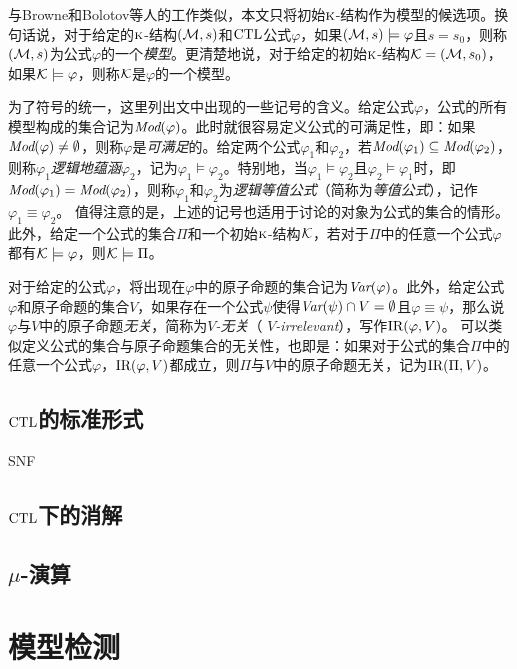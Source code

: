 与Browne和Bolotov等人的工作类似，本文只将初始$\textsc{k}$-结构作为模型的候选项\cite{browne1988characterizing,Bolotov:1999:JETAI}。换句话说，对于给定的$\textsc{k}$-结构$({\cal M},s)$和$\textrm{CTL}$公式$\varphi$，如果$({\cal M},s)\models \varphi$且$s = s_0$，则称$({\cal M},s)$为公式$\varphi$的一个\emph{模型}。更清楚地说，对于给定的初始$\textsc{k}$-结构${\cal K}=({\cal M},s_0)$，如果${\cal K} \models \varphi$，则称$\cal K$是$\varphi$的一个模型。

为了符号的统一，这里列出文中出现的一些记号的含义。给定公式$\varphi$，公式的所有模型构成的集合记为$\textit{Mod}(\varphi)$。此时就很容易定义公式的可满足性，即：如果$\textit{Mod}(\varphi)\not = \emptyset$，则称$\varphi$是\emph{可满足}的。给定两个公式$\varphi_1$和$\varphi_2$，若$\textit{Mod}(\varphi_1)\subseteq \textit{Mod}(\varphi_2)$，则称$\varphi_1$\emph{逻辑地蕴涵}$\varphi_2$，记为$\varphi_1\models \varphi_2$。特别地，当$\varphi_1\models \varphi_2$且$\varphi_2\models \varphi_1$时，即$\textit{Mod}(\varphi_1)= \textit{Mod}(\varphi_2)$，则称$\varphi_1$和$\varphi_2$为\emph{逻辑等值公式}（简称为\emph{等值公式}），记作$\varphi_1 \equiv \varphi_2$。
值得注意的是，上述的记号也适用于讨论的对象为公式的集合的情形。
此外，给定一个公式的集合$\Pi$和一个初始$\textsc{k}$-结构$\cal K$，若对于$\Pi$中的任意一个公式$\varphi$都有${\cal K} \models \varphi$，则${\cal K} \models \Pi$。

对于给定的公式$\varphi$，将出现在$\varphi$中的原子命题的集合记为$\textit{Var}(\varphi)$。此外，给定公式$\varphi$和原子命题的集合$V$，如果存在一个公式$\psi$使得$\textit{Var}(\psi) \cap V = \emptyset$且$\varphi \equiv \psi$，那么说$\varphi$与$V$中的原子命题\emph{无关}，简称为\emph{$V$-无关}（ \emph{$V$-irrelevant}），写作$\textrm{IR}(\varphi,V)$。
可以类似定义公式的集合与原子命题集合的无关性，也即是：如果对于公式的集合$\Pi$中的任意一个公式$\varphi$，$\textrm{IR}(\varphi,V)$都成立，则$\Pi$与$V$中的原子命题无关，记为$\textrm{IR}(\Pi,V)$。

\subsection{$\textrm{CTL}$的标准形式}
SNF

\subsection{$\textrm{CTL}$下的消解}

\subsection{$\mu$-演算}


\section{模型检测}


